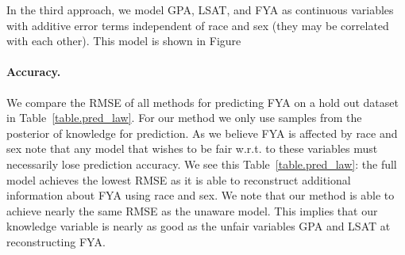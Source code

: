 In the third approach, we model GPA, LSAT, and FYA as continuous variables with additive error terms independent of race and sex (they may be correlated with each other). This model is shown in Figure





\paragraph{Accuracy.}
We compare the RMSE of all methods for predicting FYA on a hold out dataset in Table~\ref{table.pred_law}. For our method we only use samples from the posterior of knowledge for prediction. As we believe FYA is affected by race and sex note that any model that wishes to be fair w.r.t. to these variables must necessarily lose prediction accuracy. We see this Table~\ref{table.pred_law}: the full model achieves the lowest RMSE as it is able to reconstruct additional information about FYA using race and sex. We note that our method is able to achieve nearly the same RMSE as the unaware model. This implies that our knowledge variable is nearly as good as the unfair variables GPA and LSAT at reconstructing FYA.


